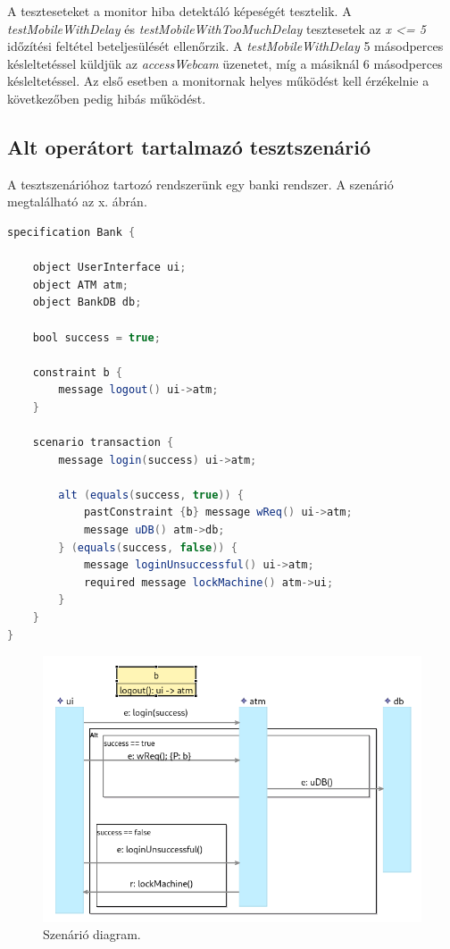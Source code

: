 A teszteseteket a monitor hiba detektáló képeségét tesztelik.
A \textit{testMobileWithDelay} és \textit{testMobileWithTooMuchDelay} tesztesetek az \textit{x <= 5} időzítési feltétel beteljesülését ellenőrzik.
A \textit{testMobileWithDelay} 5 másodperces késleltetéssel küldjük az \textit{accessWebcam} üzenetet, míg a másiknál 6 másodperces késleltetéssel.
Az első esetben a monitornak helyes működést kell érzékelnie a következőben pedig hibás működést.

\clearpage\subsection{Alt operátort tartalmazó tesztszenárió}

A tesztszenárióhoz tartozó rendszerünk egy banki rendszer.
A szenárió megtalálható az x. ábrán.

\begin{lstlisting}[language=java, frame=single, float=ht!, caption={Integrációs teszteset.},captionpos=b]
specification Bank {

    object UserInterface ui;
    object ATM atm;
    object BankDB db;

    bool success = true;

    constraint b {
        message logout() ui->atm;
    }

    scenario transaction {
        message login(success) ui->atm;

        alt (equals(success, true)) {
            pastConstraint {b} message wReq() ui->atm;
            message uDB() atm->db;
        } (equals(success, false)) {
            message loginUnsuccessful() ui->atm;
            required message lockMachine() atm->ui;
        }
    }
}
\end{lstlisting}

\begin{figure}[!ht]
    \centering
    \includegraphics[width=150mm, keepaspectratio]{figures/diagramAltExample.png}
    \caption{Szenárió diagram.}
\end{figure}


